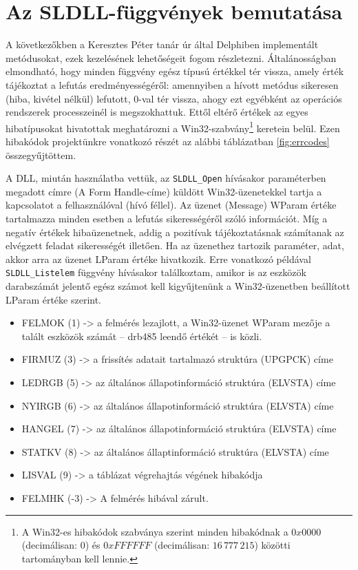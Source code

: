 \documentclass[tocnopagenum]{thesis-ekf}
\theoremstyle{definition}
\theoremstyle{remark}
\begin{document}
	\section{Az SLDLL-függvények bemutatása}
	A következőkben a Keresztes Péter tanár úr által Delphiben implementált metódusokat, ezek kezelésének lehetőségeit fogom részletezni.
	Általánosságban elmondható, hogy minden függvény egész típusú értékkel tér vissza, amely érték tájékoztat a lefutás eredményességéről: amennyiben a hívott metódus sikeresen (hiba, kivétel nélkül) lefutott, 0-val tér vissza, ahogy ezt egyébként az operációs rendszerek processzeinél is megszokhattuk. Ettől eltérő értékek az egyes hibatípusokat hivatottak meghatározni a Win32-szabvány\footnote{A Win32-es hibakódok szabványa szerint minden hibakódnak a $0x0000$ (decimálisan: 0) és $0xFFFFFF$ (decimálisan: $16\,777\,215$) közötti tartományban kell lennie.} keretein belül. Ezen hibakódok projektünkre vonatkozó részét az alábbi táblázatban \ref{fig:errcodes} összegyűjtöttem. \cite{errcodes}
	
	A DLL, miután használatba vettük, az \verb*|SLDLL_Open| hívásakor paraméterben megadott címre (A Form Handle-címe) küldött	Win32-üzenetekkel tartja a kapcsolatot a felhasználóval (hívó féllel). Az üzenet (Message) WParam értéke tartalmazza minden esetben a lefutás sikerességéről szóló információt.
	Míg a negatív értékek hibaüzenetnek, addig a pozitívak tájékoztatásnak számítanak az elvégzett feladat sikerességét illetően. Ha az üzenethez tartozik paraméter, adat, akkor arra az	üzenet LParam értéke hivatkozik. Erre vonatkozó példával \verb*|SLDLL_Listelem| függvény hívásakor találkoztam, amikor is az eszközök darabszámát jelentő egész számot kell kigyűjtenünk a Win32-üzenetben beállított LParam értéke szerint.           
	\begin{itemize}
		\item FELMOK (1) -> a felmérés lezajlott, a Win32-üzenet WParam mezője a talált eszközök számát -- drb485 leendő értékét -- is közli.
		\item FIRMUZ (3) -> a frissítés adatait tartalmazó struktúra (UPGPCK) címe                          
		\item LEDRGB (5) -> az általános állapotinformáció struktúra (ELVSTA) címe    
		\item NYIRGB (6) -> az általános állapotinformáció struktúra (ELVSTA) címe    
		\item HANGEL (7) -> az általános állapotinformáció struktúra (ELVSTA) címe    
		\item STATKV (8) -> az általános állaptinformáció struktúra (ELVSTA) címe    
		\item LISVAL (9) -> a táblázat végrehajtás végének hibakódja                 
		\item FELMHK (-3) -> A felmérés hibával zárult.
	\end{itemize}
	
\end{document}
